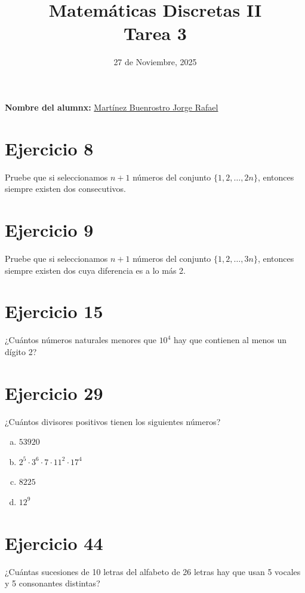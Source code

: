 \documentclass[12pt,a4paper]{article}
\title{Matemáticas Discretas II\\
Tarea 3}
\date{27 de Noviembre, 2025}
\author{}
\begin{document}
\maketitle

\noindent\textbf{Nombre del alumnx:} \underline{\hspace{0.5cm}Martínez Buenrostro Jorge Rafael\hspace{0.5cm}}

\vspace{1cm}

\section*{Ejercicio 8}
Pruebe que si seleccionamos $n+1$ números del conjunto $\{1, 2, \ldots, 2n\}$, entonces siempre existen dos consecutivos.

\section*{Ejercicio 9}
Pruebe que si seleccionamos $n+1$ números del conjunto $\{1, 2, \ldots, 3n\}$, entonces siempre existen dos cuya diferencia es a lo más 2.

\section*{Ejercicio 15}
¿Cuántos números naturales menores que $10^4$ hay que contienen al menos un dígito 2?

\section*{Ejercicio 29}
¿Cuántos divisores positivos tienen los siguientes números?
\begin{enumerate}[a)]
    \item $53920$
    \item $2^5 \cdot 3^6 \cdot 7 \cdot 11^2 \cdot 17^4$
    \item $8225$
    \item $12^9$
    
\end{enumerate}

\section*{Ejercicio 44}
¿Cuántas sucesiones de 10 letras del alfabeto de 26 letras hay que usan 5 vocales y 5 consonantes distintas?
\end{document}
